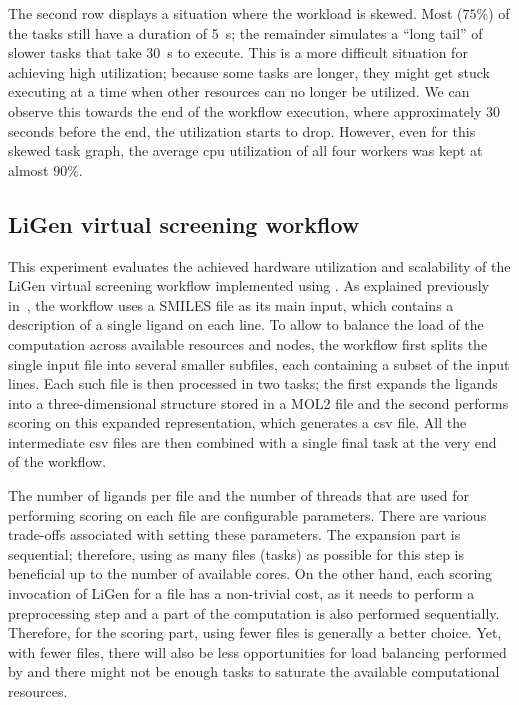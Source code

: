 The second row displays a situation where the workload is skewed. Most ($75\%$) of
the tasks still have a duration of \SI{5}{\second}; the remainder simulates a ``long tail''
of slower tasks that take \SI{30}{\second} to execute. This is a more difficult situation
for achieving high utilization; because some tasks are longer, they might get stuck executing at a
time when other resources can no longer be utilized. We can observe this towards the end of the
workflow execution, where approximately $30$ seconds before the end, the
utilization starts to drop. However, even for this skewed task graph, the average
\gls{cpu} utilization of all four workers was kept at almost $90\%$.

\subsection{LiGen virtual screening workflow}
\label{sec:hq-exp-ligen}
This experiment evaluates the achieved hardware utilization and scalability of the LiGen virtual
screening workflow implemented using \hyperqueue{}. As explained previously
in~, the workflow uses a SMILES file as its main input, which contains a
description of a single ligand on each line. To allow \hyperqueue{} to balance the load
of the computation across available resources and nodes, the workflow first splits the single input
file into several smaller subfiles, each containing a subset of the input lines. Each such file is
then processed in two tasks; the first expands the ligands into a three-dimensional structure
stored in a MOL2 file and the second performs scoring on this expanded representation, which
generates a \gls{csv} file. All the intermediate \gls{csv} files are
then combined with a single final task at the very end of the workflow.

The number of ligands per file and the number of threads that are used for performing scoring on
each file are configurable parameters. There are various trade-offs associated with setting these
parameters. The expansion part is sequential; therefore, using as many files (tasks) as possible
for this step is beneficial up to the number of available cores. On the other hand, each scoring
invocation of LiGen for a file has a non-trivial cost, as it needs to perform a preprocessing step
and a part of the computation is also performed sequentially. Therefore, for the scoring part,
using fewer files is generally a better choice. Yet, with fewer files, there will also be less
opportunities for load balancing performed by \hq{} and there might not be enough
tasks to saturate the available computational resources.

